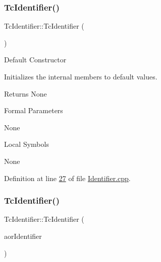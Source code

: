 \subsubsection{\texorpdfstring{Tc\+Identifier()}{TcIdentifier()}\hspace{0.1cm}{\footnotesize\ttfamily [1/2]}}
{\footnotesize\ttfamily Tc\+Identifier\+::\+Tc\+Identifier (\begin{DoxyParamCaption}\item[{void}]{ }\end{DoxyParamCaption})}

Default Constructor

Initializes the internal members to default values.

\begin{DoxyReturn}{Returns}
None
\end{DoxyReturn}
\begin{DoxyParagraph}{Formal Parameters}

\begin{DoxyPre}{\ttfamily  None }\end{DoxyPre}

\end{DoxyParagraph}
\begin{DoxyParagraph}{Local Symbols}

\begin{DoxyPre}{\ttfamily  None }\end{DoxyPre}
 
\end{DoxyParagraph}


Definition at line \mbox{\hyperlink{_identifier_8cpp_source_l00027}{27}} of file \mbox{\hyperlink{_identifier_8cpp_source}{Identifier.\+cpp}}.

\mbox{\label{class_g_n_common_1_1_n_notification_1_1_tc_identifier_a38728e27be5fd22296b49b76bdda619b}} 
\subsubsection{\texorpdfstring{Tc\+Identifier()}{TcIdentifier()}\hspace{0.1cm}{\footnotesize\ttfamily [2/2]}}
{\footnotesize\ttfamily Tc\+Identifier\+::\+Tc\+Identifier (\begin{DoxyParamCaption}\item[{const \mbox{\hyperlink{class_g_n_common_1_1_n_notification_1_1_tc_identifier}{Tc\+Identifier}} \&}]{aor\+Identifier }\end{DoxyParamCaption})}

